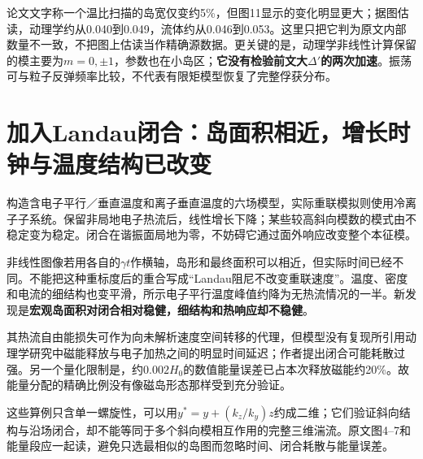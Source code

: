 论文文字称一个温比扫描的岛宽仅变约5\%，但图11显示的变化明显更大；据图估读，动理学约从0.040到0.049，流体约从0.046到0.053。这里只把它判为原文内部数量不一致，不把图上估读当作精确源数据。更关键的是，动理学非线性计算保留的模主要为$m=0,\pm1$，参数也在小岛区；\textbf{它没有检验前文大$\Delta'$的两次加速}。振荡可与粒子反弹频率比较，不代表有限矩模型恢复了完整俘获分布。

\section{加入Landau闭合：岛面积相近，增长时钟与温度结构已改变}
\citet{L244}构造含电子平行／垂直温度和离子垂直温度的六场模型，实际重联模拟则使用冷离子子系统。保留非局地电子热流后，线性增长下降；某些较高斜向模数的模式由不稳定变为稳定。闭合在谐振面局地为零，不妨碍它通过面外响应改变整个本征模。

非线性图像若用各自的$\gamma t$作横轴，岛形和最终面积可以相近，但实际时间已经不同。不能把这种重标度后的重合写成“Landau阻尼不改变重联速度”。温度、密度和电流的细结构也变平滑，所示电子平行温度峰值约降为无热流情况的一半。新发现是\textbf{宏观岛面积对闭合相对稳健，细结构和热响应却不稳健}。

其热流自由能损失可作为向未解析速度空间转移的代理，但模型没有复现所引用动理学研究中磁能释放与电子加热之间的明显时间延迟；作者提出闭合可能耗散过强。另一个量化限制是，约$0.002H_0$的数值能量误差已占本次释放磁能约20\%。故能量分配的精确比例没有像磁岛形态那样受到充分验证。

这些算例只含单一螺旋性，可以用$y^*=y+(k_z/k_y)z$约成二维；它们验证斜向结构与沿场闭合，却不能等同于多个斜向模相互作用的完整三维湍流。原文图4--7和能量段应一起读，避免只选最相似的岛图而忽略时间、闭合耗散与能量误差。
